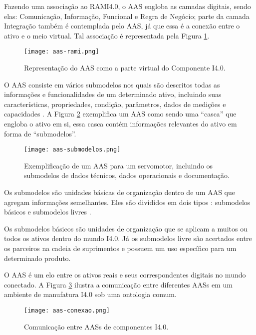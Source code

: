 	Fazendo uma associação ao RAMI4.0, o AAS engloba as camadas digitais, sendo elas: Comunicação, Informação, Funcional e Regra de Negócio; parte da camada Integração também é contemplada pelo AAS, já que essa é a conexão entre o ativo e o meio virtual. Tal associação é representada pela Figura \ref{fig:aas-rami}.

	\begin{figure}[hbt!]
		\centering
		\caption{Representação do AAS como a parte virtual do Componente I4.0.}
		\texttt{[image: aas-rami.png]}
		\label{fig:aas-rami}
	\end{figure}
		
	O AAS consiste em vários submodelos nos quais são descritos todas as informações e funcionalidades de um determinado ativo, incluindo suas características, propriedades, condição, parâmetros, dados de medições e capacidades \cite{bader2019aas}. A Figura \ref{fig:aas-submodelos} exemplifica um AAS como sendo uma ``casca'' que engloba o ativo em si, essa casca contém informações relevantes do ativo em forma de ``submodelos''.
	
	\begin{figure}[hbt!]
		\centering
		\caption{Exemplificação de um AAS para um servomotor, incluindo os submodelos de dados técnicos, dados operacionais e documentação.}
		\texttt{[image: aas-submodelos.png]}
		\label{fig:aas-submodelos}
	\end{figure}

	Os submodelos são unidades básicas de organização dentro de um AAS que agregam informações semelhantes. Eles são divididos em dois tipos \cite{plattform2019detailsaas}: submodelos básicos e submodelos livres \cite{bader2019aas}.
	
	Os submodelos básicos são unidades de organização que se aplicam a muitos ou todos os ativos dentro do mundo I4.0. Já os submodelos livre são acertados entre os parceiros na cadeia de suprimentos e possuem um uso específico para um determinado produto.
	
	O AAS é um elo entre os ativos reais e seus correspondentes digitais no mundo conectado. A Figura \ref{fig:aas-conexao} ilustra a comunicação entre diferentes AASs em um ambiente de manufatura I4.0 sob uma ontologia comum.
	
	\begin{figure}[hbt!]
		\centering
		\caption{Comunicação entre AASs de componentes I4.0.}
		\texttt{[image: aas-conexao.png]}
		\label{fig:aas-conexao}
	\end{figure}

